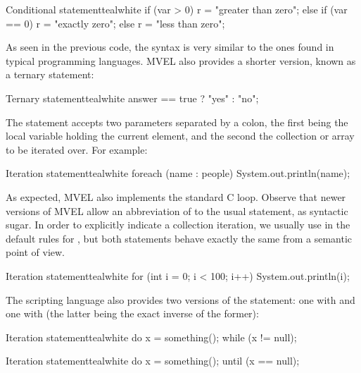 \begin{codebox}{Conditional statement}{teal}{\icnote}{white}
if (var > 0) {
   r = "greater than zero";
}
else if (var == 0) { 
   r = "exactly zero";
}
else { 
   r = "less than zero";
}
\end{codebox}

As seen in the previous code, the syntax is very similar to the ones found in typical programming languages. MVEL also provides a shorter version, known as a ternary statement:

\begin{codebox}{Ternary statement}{teal}{\icnote}{white}
answer == true ? "yes" : "no";
\end{codebox}

The  statement accepts two parameters separated by a colon, the first being the local variable holding the current element, and the second the collection or array to be iterated over. For example:

\begin{codebox}{Iteration statement}{teal}{\icnote}{white}
foreach (name : people) {
    System.out.println(name);
}
\end{codebox}

As expected, MVEL also implements the standard C  loop. Observe that newer versions of MVEL allow an abbreviation of  to the usual  statement, as syntactic sugar. In order to explicitly indicate a collection iteration, we usually use  in the default rules for \arara, but both statements behave exactly the same from a semantic point of view. 

\begin{codebox}{Iteration statement}{teal}{\icnote}{white}
for (int i = 0; i < 100; i++) { 
   System.out.println(i);
}
\end{codebox}

The scripting language also provides two versions of the  statement: one with  and one with  (the latter being the exact inverse of the former):

\begin{codebox}{Iteration statement}{teal}{\icnote}{white}
do {
    x = something();
} while (x != null);
\end{codebox}

\begin{codebox}{Iteration statement}{teal}{\icnote}{white}
do {
   x = something();
} until (x == null);
\end{codebox}

